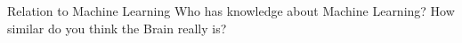 
\begin{frame}[c]{Relation to Machine Learning}
    \Large
    \pause
    Who has knowledge about Machine Learning? \newline \newline
    \pause
    How similar do you think the Brain really is?
\end{frame}


